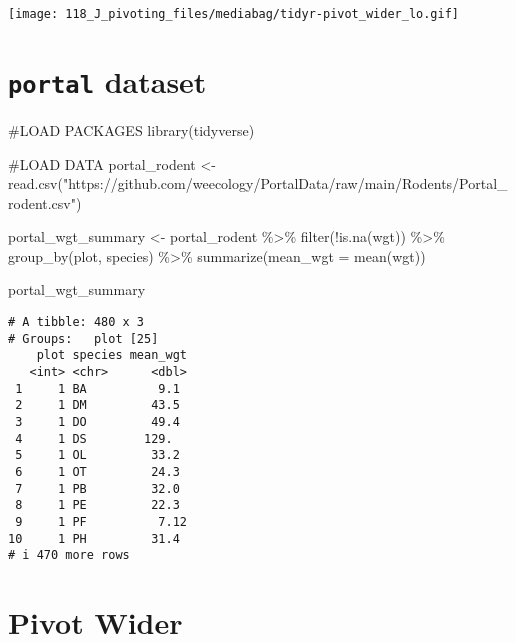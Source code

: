 \documentclass[
  letterpaper,
  DIV=11,
  numbers=noendperiod]{scrartcl}
\newenvironment{Shaded}{\begin{snugshade}}{\end{snugshade}}
\newcommand{\AttributeTok}[1]{\textcolor[rgb]{0.40,0.45,0.13}{#1}}
\newcommand{\CommentTok}[1]{\textcolor[rgb]{0.37,0.37,0.37}{#1}}
\newcommand{\FunctionTok}[1]{\textcolor[rgb]{0.28,0.35,0.67}{#1}}
\newcommand{\NormalTok}[1]{\textcolor[rgb]{0.00,0.23,0.31}{#1}}
\newcommand{\OtherTok}[1]{\textcolor[rgb]{0.00,0.23,0.31}{#1}}
\newcommand{\SpecialCharTok}[1]{\textcolor[rgb]{0.37,0.37,0.37}{#1}}
\newcommand{\StringTok}[1]{\textcolor[rgb]{0.13,0.47,0.30}{#1}}
\begin{document}
\texttt{[image: 118\_J\_pivoting\_files/mediabag/tidyr-pivot\_wider\_lo.gif]}

\hypertarget{portal-dataset}{%
\section{\texorpdfstring{\texttt{portal}
dataset}{portal dataset}}\label{portal-dataset}}

\begin{Shaded}
\begin{Highlighting}[]
\CommentTok{\#LOAD PACKAGES}
\FunctionTok{library}\NormalTok{(tidyverse)}

\CommentTok{\#LOAD DATA}
\NormalTok{portal\_rodent }\OtherTok{\textless{}{-}} \FunctionTok{read.csv}\NormalTok{(}\StringTok{"https://github.com/weecology/PortalData/raw/main/Rodents/Portal\_rodent.csv"}\NormalTok{)}
\end{Highlighting}
\end{Shaded}

\begin{Shaded}
\begin{Highlighting}[]
\NormalTok{portal\_wgt\_summary }\OtherTok{\textless{}{-}}\NormalTok{ portal\_rodent }\SpecialCharTok{\%\textgreater{}\%}
  \FunctionTok{filter}\NormalTok{(}\SpecialCharTok{!}\FunctionTok{is.na}\NormalTok{(wgt)) }\SpecialCharTok{\%\textgreater{}\%}
  \FunctionTok{group\_by}\NormalTok{(plot, species) }\SpecialCharTok{\%\textgreater{}\%}
  \FunctionTok{summarize}\NormalTok{(}\AttributeTok{mean\_wgt =} \FunctionTok{mean}\NormalTok{(wgt))}

\NormalTok{portal\_wgt\_summary}
\end{Highlighting}
\end{Shaded}

\begin{verbatim}
# A tibble: 480 x 3
# Groups:   plot [25]
    plot species mean_wgt
   <int> <chr>      <dbl>
 1     1 BA          9.1 
 2     1 DM         43.5 
 3     1 DO         49.4 
 4     1 DS        129.  
 5     1 OL         33.2 
 6     1 OT         24.3 
 7     1 PB         32.0 
 8     1 PE         22.3 
 9     1 PF          7.12
10     1 PH         31.4 
# i 470 more rows
\end{verbatim}

\hypertarget{pivot-wider}{%
\section{Pivot Wider}\label{pivot-wider}}
\end{document}
